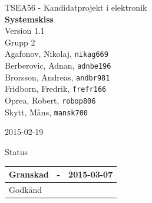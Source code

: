 \documentclass[11pt]{article}
\date{}
\begin{document}
\begin{titlepage}
\begin{center}
TSEA56 - Kandidatprojekt i elektronik \\[0.5in] 
{\Large\bfseries Systemskiss}\\
%
\vspace{4\baselineskip}
%
Version 1.1\\
\vspace{2\baselineskip}
%
Grupp 2 \\
Agafonov, Nikolaj, 
\texttt{nikag669}
\\
Berberovic, Adnan, 
\texttt{adnbe196}
\\
Brorsson, Andreas, 
\texttt{andbr981}
\\
Fridborn, Fredrik, 
\texttt{frefr166}
\\
Oprea, Robert, 
\texttt{robop806}
\\
Skytt, Måns, 
\texttt{mansk700}

\vspace{2\baselineskip}
2015-02-19

\vspace{19\baselineskip}
Status
\begin{longtable}{|l|l|l|} \hline

Granskad &
- &
2015-03-07 \\ \hline
Godkänd &
 &
 \\ \hline
 
\end{longtable}

\end{center}
\end{titlepage}
\end{document}
